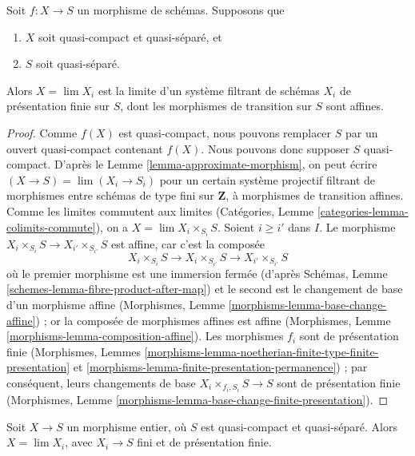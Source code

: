 \begin{lemma}
\label{lemma-relative-approximation}
Soit $f : X \to S$ un morphisme de schémas. Supposons que
\begin{enumerate}
\item $X$ soit quasi-compact et quasi-séparé, et
\item $S$ soit quasi-séparé.
\end{enumerate}
Alors $X = \lim X_i$ est la limite d'un système filtrant de schémas $X_i$
de présentation finie sur $S$, dont les morphismes de transition sur $S$
sont affines.
\end{lemma}

\begin{proof}
Comme $f(X)$ est quasi-compact, nous pouvons remplacer $S$ par un ouvert
quasi-compact contenant $f(X)$. Nous pouvons donc supposer $S$
quasi-compact. D'après le Lemme \ref{lemma-approximate-morphism}, on peut
écrire $(X \to S) = \lim (X_i \to S_i)$ pour un certain système projectif
filtrant de morphismes entre schémas de type fini sur $\mathbf{Z}$, à
morphismes de transition affines. Comme les limites commutent aux limites
(Catégories, Lemme \ref{categories-lemma-colimits-commute}), on a
$X = \lim X_i \times_{S_i} S$. Soient $i \geq i'$ dans $I$. Le morphisme
$X_i \times_{S_i} S \to X_{i'} \times_{S_{i'}} S$ est affine, car c'est la
composée
$$
X_i \times_{S_i} S \to X_i \times_{S_{i'}} S \to X_{i'} \times_{S_{i'}} S
$$
où le premier morphisme est une immersion fermée (d'après Schémas,
Lemme \ref{schemes-lemma-fibre-product-after-map}) et le second est le
changement de base d'un morphisme affine (Morphismes,
Lemme \ref{morphisms-lemma-base-change-affine}) ; or la composée de morphismes
affines est affine (Morphismes,
Lemme \ref{morphisms-lemma-composition-affine}). Les morphismes $f_i$ sont de
présentation finie (Morphismes, Lemmes
\ref{morphisms-lemma-noetherian-finite-type-finite-presentation} et
\ref{morphisms-lemma-finite-presentation-permanence}) ; par conséquent,
leurs changements de base $X_i \times_{f_i, S_i} S \to S$ sont de
présentation finie (Morphismes,
Lemme \ref{morphisms-lemma-base-change-finite-presentation}).
\end{proof}

\begin{lemma}
\label{lemma-integral-limit-finite-and-finite-presentation}
Soit $X \to S$ un morphisme entier, où $S$ est quasi-compact et
quasi-séparé. Alors $X = \lim X_i$, avec $X_i \to S$ fini et de présentation
finie.
\end{lemma}

